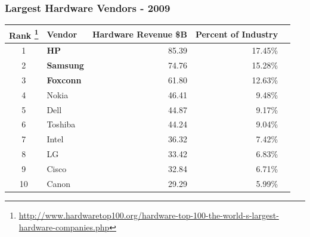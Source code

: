 \documentclass[18pt]{beamer}
\begin{document}
{
\begin{frame}
\frametitle{Largest Hardware Vendors - 2009}

\begin{center}
\begin{tabular}{clrrr}
\hline
  \textbf{Rank
\footnote{
\url{http://www.hardwaretop100.org/hardware-top-100-the-world-s-largest-hardware-companies.php}}
} &\textbf{Vendor} & \textbf{Hardware Revenue \$B} & \textbf{Percent of Industry} \\
\hline
\hline
1 &  \textbf{HP} & 85.39 &  17.45\% \\
2 &  \textbf{Samsung} & 74.76 & 15.28\% \\
3 &  \textbf{Foxconn} & 61.80 &  12.63\% \\
4 &  Nokia & 46.41 & 9.48\% \\
5 &  Dell & 44.87 & 9.17\% \\
6 &  Toshiba & 44.24 &  9.04\% \\
7 &  Intel & 36.32 &  7.42\% \\
8 &  LG & 33.42 & 6.83\% \\
9 &  Cisco & 32.84 &  6.71\% \\
10&  Canon & 29.29 & 5.99\% \\
\end{tabular}

\end{center}
\end{frame}
}
\end{document}
